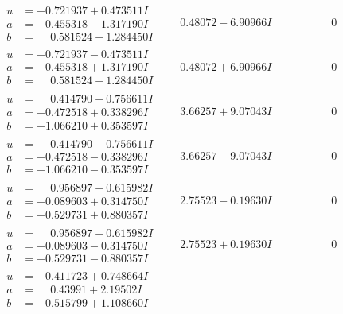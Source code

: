 \documentclass[1p]{elsarticle_modified}
\theoremstyle{definition}
\begin{document}
$$\begin{array}{c|c|c}
\begin{aligned}
u &= -0.721937 + 0.473511 I \\
a &= -0.455318 - 1.317190 I \\
b &= \phantom{-}0.581524 - 1.284450 I\end{aligned}
 & \phantom{-}0.48072 - 6.90966 I & \phantom{-0.000000 } 0 \\ \hline\begin{aligned}
u &= -0.721937 - 0.473511 I \\
a &= -0.455318 + 1.317190 I \\
b &= \phantom{-}0.581524 + 1.284450 I\end{aligned}
 & \phantom{-}0.48072 + 6.90966 I & \phantom{-0.000000 } 0 \\ \hline\begin{aligned}
u &= \phantom{-}0.414790 + 0.756611 I \\
a &= -0.472518 + 0.338296 I \\
b &= -1.066210 + 0.353597 I\end{aligned}
 & \phantom{-}3.66257 + 9.07043 I & \phantom{-0.000000 } 0 \\ \hline\begin{aligned}
u &= \phantom{-}0.414790 - 0.756611 I \\
a &= -0.472518 - 0.338296 I \\
b &= -1.066210 - 0.353597 I\end{aligned}
 & \phantom{-}3.66257 - 9.07043 I & \phantom{-0.000000 } 0 \\ \hline\begin{aligned}
u &= \phantom{-}0.956897 + 0.615982 I \\
a &= -0.089603 + 0.314750 I \\
b &= -0.529731 + 0.880357 I\end{aligned}
 & \phantom{-}2.75523 - 0.19630 I & \phantom{-0.000000 } 0 \\ \hline\begin{aligned}
u &= \phantom{-}0.956897 - 0.615982 I \\
a &= -0.089603 - 0.314750 I \\
b &= -0.529731 - 0.880357 I\end{aligned}
 & \phantom{-}2.75523 + 0.19630 I & \phantom{-0.000000 } 0 \\ \hline\begin{aligned}
u &= -0.411723 + 0.748664 I \\
a &= \phantom{-}0.43991 + 2.19502 I \\
b &= -0.515799 + 1.108660 I\end{aligned}

\end{array}$$
\end{document}
